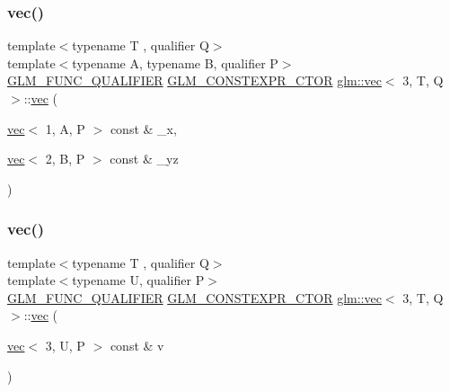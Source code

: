 \mbox{\label{structglm_1_1vec_3_013_00_01_t_00_01_q_01_4_a1f6418de9fddeaf4b97c9743808b3496}} 
\subsubsection{\texorpdfstring{vec()}{vec()}\hspace{0.1cm}{\footnotesize\ttfamily [21/23]}}
{\footnotesize\ttfamily template$<$typename T , qualifier Q$>$ \\
template$<$typename A, typename B, qualifier P$>$ \\
\mbox{\hyperlink{setup_8hpp_a33fdea6f91c5f834105f7415e2a64407}{G\+L\+M\+\_\+\+F\+U\+N\+C\+\_\+\+Q\+U\+A\+L\+I\+F\+I\+ER}} \mbox{\hyperlink{setup_8hpp_ad34178a09666081abdb573c14d1f4a5a}{G\+L\+M\+\_\+\+C\+O\+N\+S\+T\+E\+X\+P\+R\+\_\+\+C\+T\+OR}} \mbox{\hyperlink{structglm_1_1vec}{glm\+::vec}}$<$ 3, T, Q $>$\+::\mbox{\hyperlink{structglm_1_1vec}{vec}} (\begin{DoxyParamCaption}\item[{\mbox{\hyperlink{structglm_1_1vec}{vec}}$<$ 1, A, P $>$ const \&}]{\+\_\+x,  }\item[{\mbox{\hyperlink{structglm_1_1vec}{vec}}$<$ 2, B, P $>$ const \&}]{\+\_\+yz }\end{DoxyParamCaption})}

\mbox{\label{structglm_1_1vec_3_013_00_01_t_00_01_q_01_4_a9f3cdc2f03db0bc50512e16a64cdb4aa}} 
\subsubsection{\texorpdfstring{vec()}{vec()}\hspace{0.1cm}{\footnotesize\ttfamily [22/23]}}
{\footnotesize\ttfamily template$<$typename T , qualifier Q$>$ \\
template$<$typename U, qualifier P$>$ \\
\mbox{\hyperlink{setup_8hpp_a33fdea6f91c5f834105f7415e2a64407}{G\+L\+M\+\_\+\+F\+U\+N\+C\+\_\+\+Q\+U\+A\+L\+I\+F\+I\+ER}} \mbox{\hyperlink{setup_8hpp_ad34178a09666081abdb573c14d1f4a5a}{G\+L\+M\+\_\+\+C\+O\+N\+S\+T\+E\+X\+P\+R\+\_\+\+C\+T\+OR}} \mbox{\hyperlink{structglm_1_1vec}{glm\+::vec}}$<$ 3, T, Q $>$\+::\mbox{\hyperlink{structglm_1_1vec}{vec}} (\begin{DoxyParamCaption}\item[{\mbox{\hyperlink{structglm_1_1vec}{vec}}$<$ 3, U, P $>$ const \&}]{v }\end{DoxyParamCaption})}

